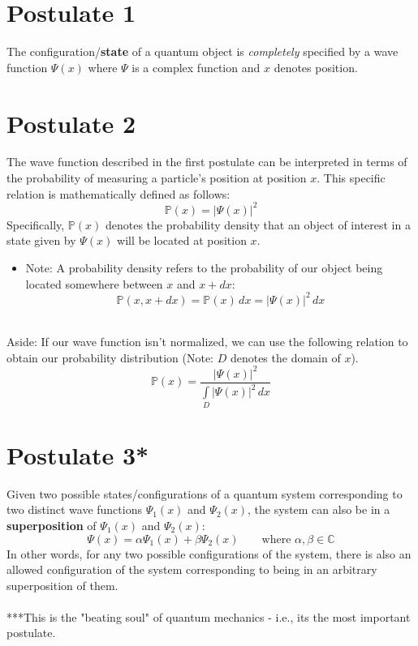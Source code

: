 \documentclass{article}
\begin{document}
\section*{Postulate 1}
The configuration/\textbf{state} of a quantum object is \textit{completely} specified by a wave function $\Psi(x)$ where $\Psi$ is a complex function and $x$ denotes position. 
\section*{Postulate 2}
The wave function described in the first postulate can be interpreted in terms of the probability of measuring a particle's position at position $x$. This specific relation is mathematically defined as follows: 
\begin{equation}
    	\mathbb{P}(x) = | \Psi (x) | ^2
\end{equation}
Specifically, $\mathbb{P}(x)$ denotes the probability density that an object of interest in a state given by $\Psi(x)$ will be located at position $x$.
\begin{itemize}
    \item Note: A probability density  refers to the probability of our object being located somewhere between $x$ and $x+dx$: 
        \begin{equation}
            \mathbb{P}(x,x+dx) = \mathbb{P}(x) \, dx = |\Psi (x)|^2 \, dx
        \end{equation}
\end{itemize}
\\
Aside: If our wave function isn't normalized, we can use the following relation to obtain our probability distribution (Note: $D$ denotes the domain of $x$).
    \begin{equation}
        \mathbb{P}(x) = \frac{|\Psi(x)|^2}{\int\limits_D \! |\Psi(x)|^2 \, dx}
    \end{equation}
\section*{Postulate 3*}
Given two possible states/configurations of a quantum system corresponding to two distinct wave functions $\Psi_1(x)$ and $\Psi_2(x)$, the system can also be in a \textbf{superposition} of $\Psi_1(x)$ and $\Psi_2(x)$: 
    \begin{equation}
        \Psi (x) = \alpha \Psi_1(x) + \beta \Psi_2(x) \quad \quad \mathrm{where} \, \, \alpha , \beta \in \mathbb{C}
    \end{equation}
In other words, for any two possible configurations of the system, there is also an allowed configuration of the system corresponding to being in an arbitrary superposition of them.
\\
\\
***This is the "beating soul" of quantum mechanics - i.e., its the most important postulate. 
\end{document}
